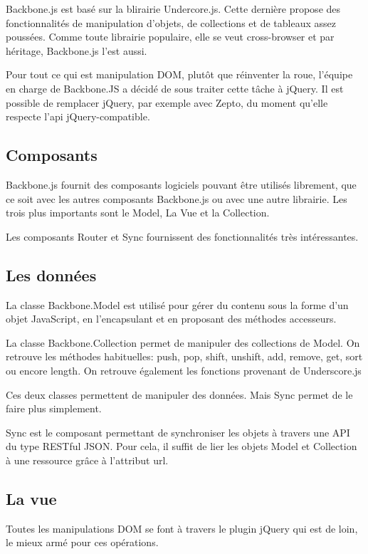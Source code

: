 Backbone.js est basé sur la blirairie Undercore.js. Cette dernière propose des fonctionnalités de manipulation d’objets, de collections et de tableaux assez poussées. Comme toute librairie populaire, elle se veut cross-browser et par héritage, Backbone.js l’est aussi.

Pour tout ce qui est manipulation DOM, plutôt que réinventer la roue, l’équipe en charge de Backbone.JS a décidé de sous traiter cette tâche à jQuery. Il est possible de remplacer jQuery, par exemple avec Zepto, du moment qu’elle respecte l’api jQuery-compatible.

\subsection{Composants}


Backbone.js fournit des composants logiciels pouvant être utilisés librement, que ce soit avec les autres composants Backbone.js ou avec une autre librairie. Les trois plus importants sont le Model, La Vue et la Collection.

Les composants Router et Sync fournissent des fonctionnalités très intéressantes.


\subsection{Les données}


La classe Backbone.Model est utilisé pour gérer du contenu sous la forme d’un objet JavaScript, en l’encapsulant et en proposant des méthodes accesseurs.

La classe Backbone.Collection permet de manipuler des collections de Model. On retrouve les méthodes habituelles: push, pop, shift, unshift, add, remove, get, sort ou encore length. On retrouve également les fonctions provenant de Underscore.js

Ces deux classes permettent de manipuler des données. Mais Sync permet de le faire plus simplement.

Sync est le composant permettant de synchroniser les objets à travers une API du type RESTful JSON. Pour cela, il suffit de lier les objets Model et Collection à une ressource grâce à l’attribut url.

\subsection{La vue}

Toutes les manipulations DOM se font à travers le plugin jQuery qui est de loin, le mieux armé pour ces opérations.

